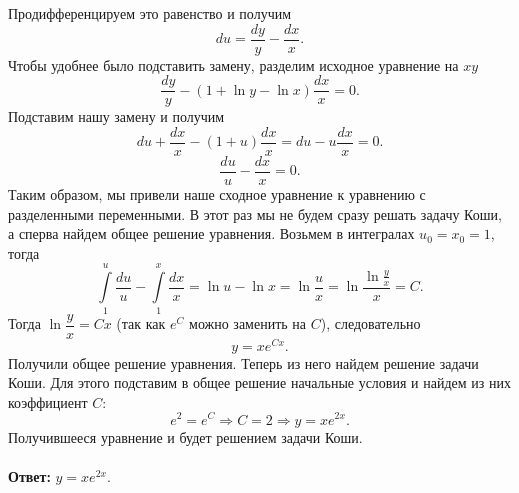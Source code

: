 \documentclass[a4paper, 12pt]{article}
\begin{document}
Продифференцируем это равенство и получим $$du = \dfrac{dy}{y} - \dfrac{dx}{x}.$$
Чтобы удобнее было подставить замену, разделим исходное уравнение на $xy$ $$\dfrac{dy}{y} - (1 + \ln y - \ln x)\dfrac{dx}{x} = 0.$$
Подставим нашу замену и получим $$du + \dfrac{dx}{x} - (1+u)\dfrac{dx}{x} = du - u\dfrac{dx}{x} = 0.$$
$$\dfrac{du}{u} - \dfrac{dx}{x} = 0.$$
Таким образом, мы привели наше сходное уравнение к уравнению с разделенными переменными. В этот раз мы не будем сразу решать задачу Коши, а сперва найдем общее решение уравнения. Возьмем в интегралах $u_0 = x_0 = 1$, тогда $$\int\limits_1^u\dfrac{du}{u} - \int\limits_1^x\dfrac{dx}{x} = \ln u - \ln x =\ln \dfrac{u}{x} =\ln\dfrac{\ln\frac{y}{x}}{x}= C.$$
Тогда $\ln\dfrac{y}{x} = Cx$ (так как $e^C$ можно заменить на $C$), следовательно $$y = xe^{Cx}.$$
Получили общее решение уравнения. Теперь из него найдем решение задачи Коши. Для этого подставим в общее решение начальные условия и найдем из них коэффициент $C$: $$e^2 = e^C\Rightarrow C = 2\Rightarrow y = xe^{2x}.$$
Получившееся уравнение и будет решением задачи Коши.\\\\
\textbf{Ответ:} $y = xe^{2x}.$
\end{document}
